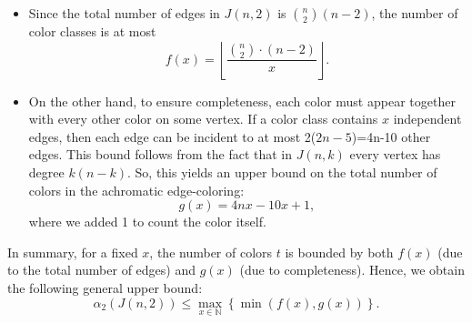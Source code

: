 \documentclass{article}
\newcommand{\blue}[1]{\textcolor{blue}{#1}}
\newcommand{\red}[1]{\textcolor{red}{#1}}
\begin{document}
\begin{itemize}
    \item[(i)] Since the total number of edges in $J(n,2)$ is $\binom{n}{2}(n - 2)$, the number of color classes is at most
    $$
    f(x) = \left\lfloor \frac{\binom{n}{2} \cdot (n - 2)}{x} \right\rfloor.
    $$
    
\item[(ii)] On the other hand, to ensure completeness, each color must appear together with every other color on some vertex. If a color class contains $x$ independent edges, then each edge can be incident to at most 2($2n -5$)=4n-10
other edges. This bound follows from the fact that in $J(n,k)$ every vertex has degree $k(n-k)$. So, %
this yields an upper bound on the total number of colors in the achromatic edge-coloring:
$$
g(x) = 4nx - 10x + 1, 
$$
where we added 1 to count the color itself.
\end{itemize}

In summary, for a fixed $x$, the number of colors $t$ is bounded by both $f(x)$ (due to the total number of edges) and $g(x)$ (due to completeness). Hence, we obtain the following general upper bound:
\begin{equation}
\label{equuperbound}
 \alpha_2(J(n,2)) \leq \max_{x \in \mathbb{N}} \left\{ \min\left( f(x), g(x) \right) \right\}.   
\end{equation}
\end{document}
